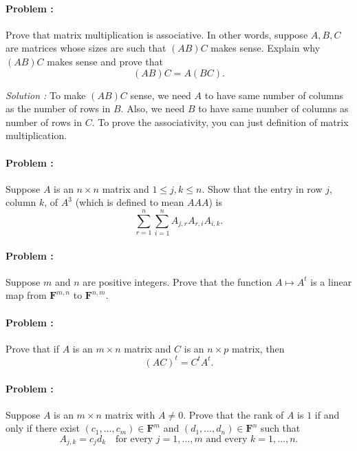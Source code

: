 \paragraph{Problem :}
Prove that matrix multiplication is associative. In other words, suppose \(A, B, C\) are matrices whose sizes are such that \((AB)C\) makes 
sense. Explain why \((AB)C\) makes sense and prove that
\[
(AB)C = A(BC).
\]

\vspace{4mm}
\textit{Solution :} To make $(AB)C$ sense, we need $A$ to have same number of columns as the number of rows in $B$. Also, we need $B$ to 
have same number of columns as number of rows in $C$. To prove the associativity, you can just definition of matrix multiplication.


\paragraph{Problem :}
Suppose \(A\) is an \(n \times n\) matrix and \(1 \leq j, k \leq n\). Show that the entry in row \(j\), column \(k\), of \(A^3\) (which is 
defined to mean \(AAA\)) is
\[
\sum_{r=1}^n \sum_{i=1}^n A_{j,r} A_{r,i} A_{i,k}.
\]

\paragraph{Problem :}
Suppose \(m\) and \(n\) are positive integers. Prove that the function \(A \mapsto A^t\) is a linear map from 
\(\mathbf{F}^{m,n}\) to \(\mathbf{F}^{n,m}\).

\paragraph{Problem :}
Prove that if \(A\) is an \(m \times n\) matrix and \(C\) is an \(n \times p\) matrix, then
\[
(AC)^t = C^t A^t.
\]

\paragraph{Problem :}
Suppose \(A\) is an \(m \times n\) matrix with \(A \neq 0\). Prove that the rank of \(A\) is \(1\) 
if and only if there exist \((c_{1}, \dots, c_{m}) \in \mathbf{F}^m\) and \((d_{1}, \dots, d_{n}) \in \mathbf{F}^n\) such that
\[
A_{j,k} = c_j d_k \quad \text{for every } j = 1, \dots, m \text{ and every } k = 1, \dots, n.
\]

